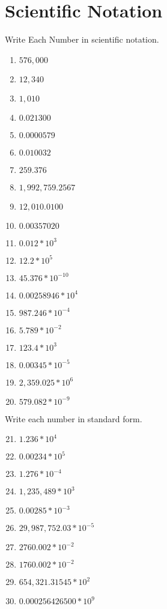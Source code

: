\documentclass{article}
\begin{document}
\section{Scientific Notation}
Write Each Number in scientific notation.
\begin{enumerate}
\item $576,000$
\item $12,340$
\item $1,010$
\item $0.021300$
\item $0.0000579$
\item $0.010032$
\item $259.376$
\item $1,992,759.2567$
\item $12,010.0100$
\item $0.00357020$
\item $0.012*10^{3}$
\item $12.2*10^{5}$
\item $45.376*10^{-10}$
\item $0.00258946*10^{4}$
\item $987.246*10^{-4}$
\item $5.789*10^{-2}$
\item $123.4*10^{3}$
\item $0.00345*10^{-5}$
\item $2,359.025*10^{6}$
\item $579.082*10^{-9}$
\end{enumerate}
Write each number in standard form.
\begin{enumerate}
\setcounter{enumi}{20}
\item $1.236*10^{4}$
\item $0.00234*10^{5}$
\item $1.276*10^{-4}$
\item $1,235,489*10^{3}$
\item $0.00285*10^{-3}$
\item $29,987,752.03*10^{-5}$
\item $2760.002*10^{-2}$
\item $1760.002*10^{-2}$
\item $654,321.31545*10^{2}$
\item $0.000256426500*10^{9}$
\end{enumerate}
\end{document}

